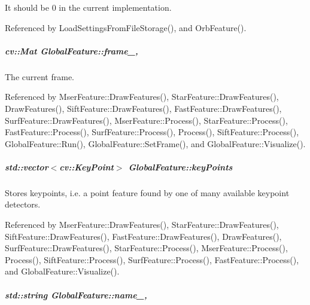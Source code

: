 It should be 0 in the current implementation. 



Referenced by Load\-Settings\-From\-File\-Storage(), and Orb\-Feature().

\hypertarget{group___feature_extractor_aae4295da2c3999edcb99b46d70ee7166}{
\subparagraph[{frame\-\_\-}]{\setlength{\rightskip}{0pt plus 5cm}cv\-::\-Mat Global\-Feature\-::frame\-\_\-\hspace{0.3cm}{\ttfamily [protected]}, {\ttfamily [inherited]}}}\label{group___feature_extractor_aae4295da2c3999edcb99b46d70ee7166}


The current frame. 



Referenced by Mser\-Feature\-::\-Draw\-Features(), Star\-Feature\-::\-Draw\-Features(), Draw\-Features(), Sift\-Feature\-::\-Draw\-Features(), Fast\-Feature\-::\-Draw\-Features(), Surf\-Feature\-::\-Draw\-Features(), Mser\-Feature\-::\-Process(), Star\-Feature\-::\-Process(), Fast\-Feature\-::\-Process(), Surf\-Feature\-::\-Process(), Process(), Sift\-Feature\-::\-Process(), Global\-Feature\-::\-Run(), Global\-Feature\-::\-Set\-Frame(), and Global\-Feature\-::\-Visualize().

\hypertarget{group___feature_extractor_a72cc606c0090a64718a7e92bca7520b9}{
\subparagraph[{key\-Points}]{\setlength{\rightskip}{0pt plus 5cm}std\-::vector$<$cv\-::\-Key\-Point$>$ Global\-Feature\-::key\-Points\hspace{0.3cm}{\ttfamily [inherited]}}}\label{group___feature_extractor_a72cc606c0090a64718a7e92bca7520b9}


Stores keypoints, i.\-e. a point feature found by one of many available keypoint detectors. 



Referenced by Mser\-Feature\-::\-Draw\-Features(), Star\-Feature\-::\-Draw\-Features(), Sift\-Feature\-::\-Draw\-Features(), Fast\-Feature\-::\-Draw\-Features(), Draw\-Features(), Surf\-Feature\-::\-Draw\-Features(), Star\-Feature\-::\-Process(), Mser\-Feature\-::\-Process(), Process(), Sift\-Feature\-::\-Process(), Surf\-Feature\-::\-Process(), Fast\-Feature\-::\-Process(), and Global\-Feature\-::\-Visualize().

\hypertarget{group___feature_extractor_abee52be830de272bd27685083bf28aae}{
\subparagraph[{name\-\_\-}]{\setlength{\rightskip}{0pt plus 5cm}std\-::string Global\-Feature\-::name\-\_\-\hspace{0.3cm}{\ttfamily [protected]}, {\ttfamily [inherited]}}}\label{group___feature_extractor_abee52be830de272bd27685083bf28aae}


